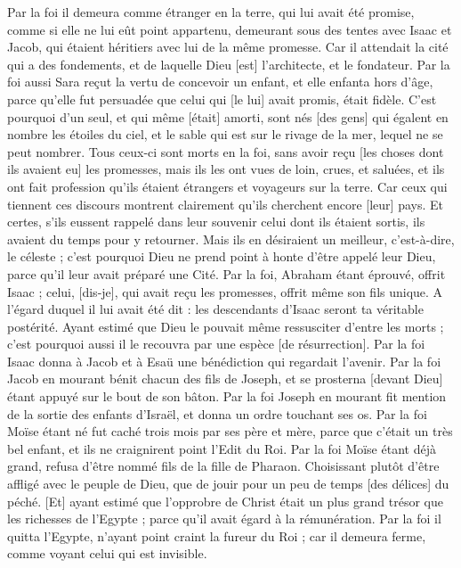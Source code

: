 \begin{multicols}{2}
Par la foi il demeura comme étranger en la terre, qui lui avait été promise, comme si elle ne lui eût point appartenu, demeurant sous des tentes avec Isaac et Jacob, qui étaient héritiers avec lui de la même promesse.
Car il attendait la cité qui a des fondements, et de laquelle Dieu [est] l'architecte, et le fondateur.
Par la foi aussi Sara reçut la vertu de concevoir un enfant, et elle enfanta hors d'âge, parce qu'elle fut persuadée que celui qui [le lui] avait promis, était fidèle.
C'est pourquoi d'un seul, et qui même [était] amorti, sont nés [des gens] qui égalent en nombre les étoiles du ciel, et le sable qui est sur le rivage de la mer, lequel ne se peut nombrer.
Tous ceux-ci sont morts en la foi, sans avoir reçu [les choses dont ils avaient eu] les promesses, mais ils les ont vues de loin, crues, et saluées, et ils ont fait profession qu'ils étaient étrangers et voyageurs sur la terre.
Car ceux qui tiennent ces discours montrent clairement qu'ils cherchent encore [leur] pays.
Et certes, s'ils eussent rappelé dans leur souvenir celui dont ils étaient sortis, ils avaient du temps pour y retourner.
Mais ils en désiraient un meilleur, c'est-à-dire, le céleste ; c'est pourquoi Dieu ne prend point à honte d'être appelé leur Dieu, parce qu'il leur avait préparé une Cité.
Par la foi, Abraham étant éprouvé, offrit Isaac ; celui, [dis-je], qui avait reçu les promesses, offrit même son fils unique.
A l'égard duquel il lui avait été dit : les descendants d'Isaac seront ta véritable postérité.
Ayant estimé que Dieu le pouvait même ressusciter d'entre les morts ; c'est pourquoi aussi il le recouvra par une espèce [de résurrection].
Par la foi Isaac donna à Jacob et à Esaü une bénédiction qui regardait l'avenir.
Par la foi Jacob en mourant bénit chacun des fils de Joseph, et se prosterna [devant Dieu] étant appuyé sur le bout de son bâton.
Par la foi Joseph en mourant fit mention de la sortie des enfants d'Israël, et donna un ordre touchant ses os.
Par la foi Moïse étant né fut caché trois mois par ses père et mère, parce que c'était un très bel enfant, et ils ne craignirent point l'Edit du Roi.
Par la foi Moïse étant déjà grand, refusa d'être nommé fils de la fille de Pharaon.
Choisissant plutôt d'être affligé avec le peuple de Dieu, que de jouir pour un peu de temps [des délices] du péché.
[Et] ayant estimé que l'opprobre de Christ était un plus grand trésor que les richesses de l'Egypte ; parce qu'il avait égard à la rémunération.
Par la foi il quitta l'Egypte, n'ayant point craint la fureur du Roi ; car il demeura ferme, comme voyant celui qui est invisible.

\end{multicols}

